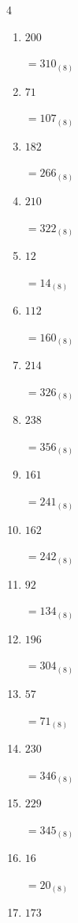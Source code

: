 \begin{multicols}{4}
\begin{enumerate}
  \item $200$

        $=310_{(8)}$

  \item $71$

        $=107_{(8)}$

  \item $182$

        $=266_{(8)}$

  \item $210$

        $=322_{(8)}$

  \item $12$

        $=14_{(8)}$

  \item $112$

        $=160_{(8)}$

  \item $214$

        $=326_{(8)}$

  \item $238$

        $=356_{(8)}$

\columnbreak %

  \item $161$

        $=241_{(8)}$

  \item $162$

        $=242_{(8)}$

  \item $92$

        $=134_{(8)}$

  \item $196$

        $=304_{(8)}$

  \item $57$

        $=71_{(8)}$

  \item $230$

        $=346_{(8)}$

  \item $229$

        $=345_{(8)}$

  \item $16$

        $=20_{(8)}$

  \item $173$


\end{enumerate}
\end{multicols}
